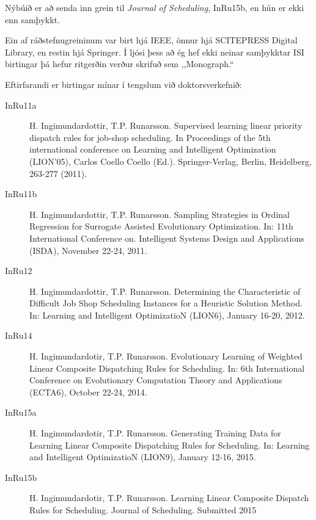\documentclass{cover}
\begin{document}
{Nýbúið er að senda inn grein til \emph{Journal of Scheduling}, InRu15b, 
en hún er ekki enn samþykkt. 

Ein af ráðstefnugreininum var birt hjá IEEE, önnur hjá SCITEPRESS Digital 
Library, en restin hjá Springer. 
Í ljósi þess að ég hef ekki neinar samþykktar ISI birtingar þá hefur ritgerðin 
verður skrifuð sem ,,Monograph.``

Eftirfarandi er birtingar mínar í tengslum við doktorsverkefnið:
\begin{description}
    \item[InRu11a] H. Ingimundardottir, T.P. Runarsson. Supervised learning 
    linear priority dispatch rules for job-shop scheduling. In Proceedings of 
    the 5th international conference on Learning and Intelligent Optimization 
    (LION'05), Carlos Coello Coello (Ed.). Springer-Verlag, Berlin, Heidelberg, 
    263-277 (2011). %

    \item[InRu11b] H. Ingimundardottir, T.P. Runarsson. Sampling Strategies in 
    Ordinal Regression for Surrogate Assisted Evolutionary Optimization. In: 
    11th International Conference on. Intelligent Systems Design and 
    Applications (ISDA), November 22-24, 2011. %

    \item[InRu12] H. Ingimundardottir, T.P. Runarsson. Determining the 
    Characteristic of Difficult Job Shop Scheduling Instances for a Heuristic 
    Solution Method. In: Learning and Intelligent OptimizatioN (LION6), January 
    16-20, 2012. %
       
    \item[InRu14] H. Ingimundardotir, T.P. Runarsson. Evolutionary Learning of 
    Weighted Linear Composite Dispatching Rules for Scheduling. In: 6th 
    International Conference on Evolutionary Computation Theory and 
    Applications (ECTA6), October 22-24, 2014. %
    
    \item[InRu15a] H. Ingimundardotir, T.P. Runarsson. Generating Training Data 
    for Learning Linear Composite Dispatching Rules for Scheduling. In: 
    Learning and Intelligent OptimizatioN (LION9), January 12-16, 2015. 
    
    \item[InRu15b] H. Ingimundardotir, T.P. Runarsson. Learning Linear 
    Composite Dispatch Rules for Scheduling. Journal of Scheduling. 
    Submitted 2015
\end{description}

}
\end{document}
